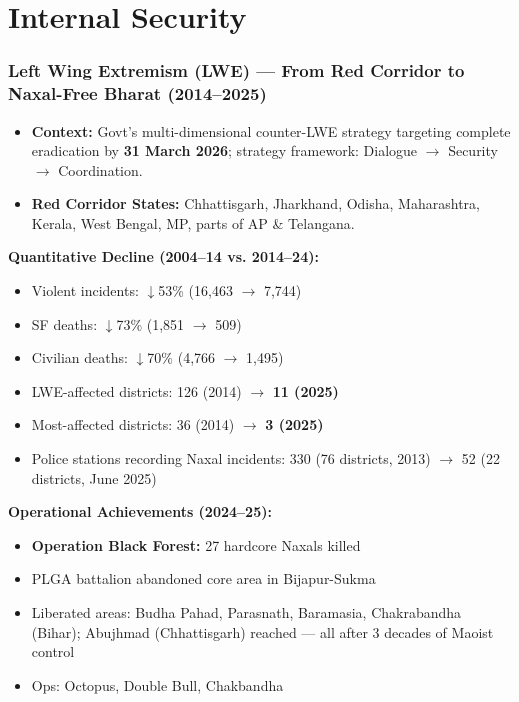 
\chapter{Internal Security}

\subsection{Left Wing Extremism (LWE) — From Red Corridor to Naxal-Free Bharat (2014–2025)}

\begin{itemize}

  \item \textbf{Context:} Govt's multi-dimensional counter-LWE strategy targeting complete eradication by \textbf{31 March 2026}; strategy framework: Dialogue $\rightarrow$ Security $\rightarrow$ Coordination.

  \item \textbf{Red Corridor States:} Chhattisgarh, Jharkhand, Odisha, Maharashtra, Kerala, West Bengal, MP, parts of AP \& Telangana.

\end{itemize}

\textbf{Quantitative Decline (2004–14 vs. 2014–24):}
\begin{itemize}
  \item Violent incidents: $\downarrow$53\% (16,463 $\to$ 7,744)
  \item SF deaths: $\downarrow$73\% (1,851 $\to$ 509)
  \item Civilian deaths: $\downarrow$70\% (4,766 $\to$ 1,495)
  \item LWE-affected districts: 126 (2014) $\to$ \textbf{11 (2025)}
  \item Most-affected districts: 36 (2014) $\to$ \textbf{3 (2025)}
  \item Police stations recording Naxal incidents: 330 (76 districts, 2013) $\to$ 52 (22 districts, June 2025)
\end{itemize}

\textbf{Operational Achievements (2024–25):}
\begin{itemize}
  \item \textbf{Operation Black Forest:} 27 hardcore Naxals killed
  \item PLGA battalion abandoned core area in Bijapur-Sukma
  \item Liberated areas: Budha Pahad, Parasnath, Baramasia, Chakrabandha (Bihar); Abujhmad (Chhattisgarh) reached — all after 3 decades of Maoist control
  \item Ops: Octopus, Double Bull, Chakbandha
\end{itemize}


